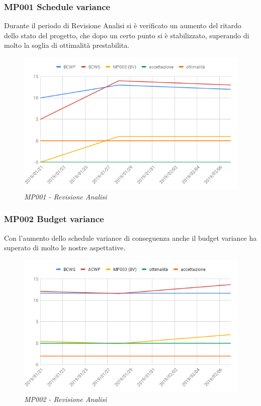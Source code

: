 \subsubsection{MP001 Schedule variance}
Durante il periodo di Revisione Analisi si è verificato un aumento del ritardo dello stato del progetto, che dopo un certo punto si è stabilizzato, superando di molto la soglia di ottimalità prestabilita.
\begin{figure} [h]
    \centering
	\includegraphics[scale=0.5]{./images/svRa.png}
	\caption{\textit{MP001 - Revisione Analisi}}\label{}
\end{figure}
\pagebreak
\subsubsection{MP002 Budget variance}
Con l'aumento dello schedule variance di conseguenza anche il budget variance ha superato di molto le nostre aspettative.
\begin{figure} [h]
    \centering
	\includegraphics[scale=0.5]{./images/bvra.png}
	\caption{\textit{MP002 - Revisione Analisi}}\label{}
\end{figure}
